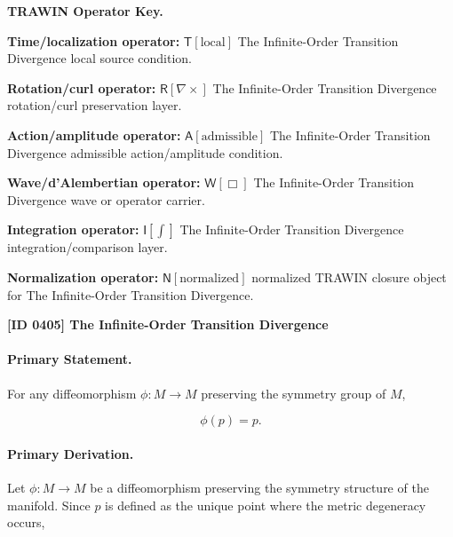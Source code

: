 \par\vspace{0.45\baselineskip}
\noindent\begin{minipage}[t]{\linewidth}
\begingroup
\small
\raggedright
\textbf{TRAWIN Operator Key.}\par
\noindent\textbf{Time/localization operator:} $\mathsf{T}\!\left[\mathrm{local}\right]$ The Infinite-Order Transition Divergence local source condition.\par
\noindent\textbf{Rotation/curl operator:} $\mathsf{R}\!\left[\nabla\times\right]$ The Infinite-Order Transition Divergence rotation/curl preservation layer.\par
\noindent\textbf{Action/amplitude operator:} $\mathsf{A}\!\left[\mathrm{admissible}\right]$ The Infinite-Order Transition Divergence admissible action/amplitude condition.\par
\noindent\textbf{Wave/d'Alembertian operator:} $\mathsf{W}\!\left[\Box\right]$ The Infinite-Order Transition Divergence wave or operator carrier.\par
\noindent\textbf{Integration operator:} $\mathsf{I}\!\left[\int\right]$ The Infinite-Order Transition Divergence integration/comparison layer.\par
\noindent\textbf{Normalization operator:} $\mathsf{N}\!\left[\mathrm{normalized}\right]$ normalized TRAWIN closure object for The Infinite-Order Transition Divergence.\par
\endgroup
\end{minipage}

\clearpage
\noindent\textbf{[ID 0405] The Infinite-Order Transition Divergence}\par
\vspace{0.35em}
\paragraph{Primary Statement.}
For any diffeomorphism $\phi:M\to M$ preserving the symmetry group of $M$,

\begin{equation}
\phi(p)=p .
\end{equation}

\paragraph{Primary Derivation.}
Let $\phi:M\to M$ be a diffeomorphism preserving the symmetry structure of the manifold. Since $p$ is defined as the unique point where the metric degeneracy occurs,

